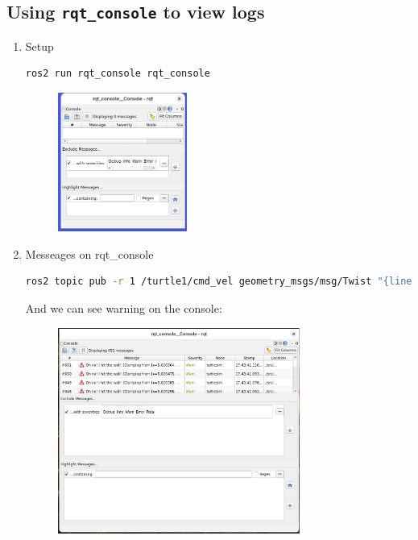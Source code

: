 \documentclass[12pt, a4paper]{article}
\begin{document}
\subsection{Using \texttt{rqt\_console} to view logs}
\begin{enumerate}
	\item Setup
\begin{lstlisting}[language=bash]
ros2 run rqt_console rqt_console
\end{lstlisting}
\begin{figure}[h]
	\centering
	\includegraphics[width=0.4\textwidth]{p1.8-1}
\end{figure}

\item Messeages on rqt\_console\\
\begin{lstlisting}[language=bash]
ros2 topic pub -r 1 /turtle1/cmd_vel geometry_msgs/msg/Twist "{linear: {x: 2.0, y: 0.0, z: 0.0}, angular: {x: 0.0,y: 0.0,z: 0.0}}"
\end{lstlisting}
And we can see warning on the console:
\begin{figure}[h]
	\centering
	\includegraphics[width=0.75\textwidth]{p1.8-2}
\end{figure}


\end{enumerate}
\end{document}
